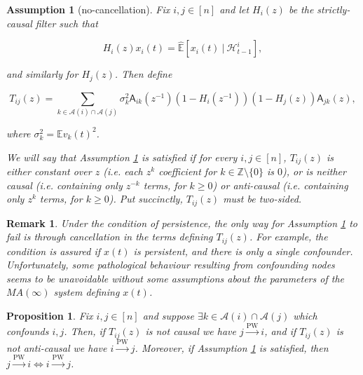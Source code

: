 \documentclass{statsoc}
\def\pwgc{\overset{\text{PW}}{\rightarrow}}  %
\def\A{\mathsf{A}}  %
\def\H{\mathcal{H}}  %
\newcommand{\linE}[2]{\hat{\E}[#1\ |\ #2]}  %
\newcommand{\anc}[1]{\mathcal{A}(#1)}  %
\newtheorem{proposition}{Proposition}
\newtheorem{remark}{Remark}
\newtheorem{assumption}{Assumption}
\def\H{\mathcal{H}}  %
\def\E{\mathbb{E}}  %
\def\Z{\mathbb{Z}}  %
\begin{document}
\begin{assumption}[no-cancellation]
  \label{ass:T_causality}
  Fix $i, j \in [n]$ and let $H_i(z)$ be the strictly-causal filter
  such that

  \begin{equation*}
    H_i(z)x_i(t) = \linE{x_i(t)}{\H_{t - 1}^i},
  \end{equation*}

  and similarly for $H_j(z)$.  Then define

  \begin{equation}
    \label{eqn:T_filter}
    T_{ij}(z) = \sum_{k \in \anc{i} \cap \anc{j}}\sigma_k^2\A_{ik}(z^{-1})(1 - H_i(z^{-1}))(1 - H_j(z))\A_{jk}(z),
  \end{equation}

  where $\sigma_k^2 = \E v_k(t)^2$.

  We will say that Assumption \ref{ass:T_causality} is satisfied if
  for every $i, j \in [n]$, $T_{ij}(z)$ is either constant over $z$
  (i.e. each $z^k$ coefficient for $k \in \Z \setminus \{0\}$ is $0$),
  or is \textit{neither} causal (i.e. containing only $z^{-k}$ terms,
  for $k \ge 0$) \textit{or} anti-causal (i.e. containing only $z^k$
  terms, for $k \ge 0$).  Put succinctly, $T_{ij}(z)$ must be
  two-sided.
\end{assumption}

\begin{remark}
  Under the condition of persistence, the only way for Assumption
  \ref{ass:T_causality} to fail is through cancellation in the terms
  defining $T_{ij}(z)$.  For example, the condition is assured if
  $x(t)$ is persistent, and there is only a single confounder.
  Unfortunately, some pathological behaviour resulting from
  confounding nodes seems to be unavoidable without some assumptions
  about the parameters of the $MA(\infty)$ system defining $x(t)$.
\end{remark}

\begin{proposition}
  \label{prop:persistence_converse}
  Fix $i, j \in [n]$ and suppose $\exists k \in \anc{i} \cap \anc{j}$
  which confounds $i, j$.  Then, if $T_{ij}(z)$ is not causal we have
  $j \pwgc i$, and if $T_{ij}(z)$ is not anti-causal we have
  $i \pwgc j$.  Moreover, if Assumption \ref{ass:T_causality} is
  satisfied, then $j \pwgc i \iff i \pwgc j$.
\end{proposition}
\end{document}
